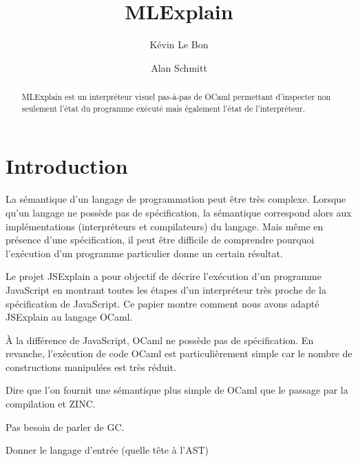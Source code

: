 \documentclass{easychair}
\title{MLExplain}
\author{
  Kévin Le Bon\inst{1}
  \and
  Alan Schmitt\inst{1}
}
\institute{
  Inria
 }
\begin{document}
\maketitle

\begin{abstract}
MLExplain est un interpréteur visuel pas-à-pas de OCaml permettant
d'inspecter non seulement l'état du programme exécuté mais également
l'état de l'interpréteur.
\end{abstract}

\section{Introduction}

La sémantique d'un langage de programmation peut être très complexe. Lorsque
qu'un langage ne possède pas de spécification, la sémantique correspond alors
aux implémentations (interpréteurs et compilateurs) du langage. Mais même en
présence d'une spécification, il peut être difficile de comprendre pourquoi
l'exécution d'un programme particulier donne un certain résultat.

Le projet JSExplain a pour objectif de décrire l'exécution d'un programme
JavaScript en montrant toutes les étapes d'un interpréteur très proche de la
spécification de JavaScript. Ce papier montre comment nous avons adapté
JSExplain au langage OCaml.

À la différence de JavaScript, OCaml ne possède pas de spécification. En
revanche, l'exécution de code OCaml est particulièrement simple car le nombre de
constructions manipulées est très réduit. 

Dire que l'on fournit une sémantique plus simple de OCaml que le passage par la
compilation et ZINC.

Pas besoin de parler de GC.

Donner le langage d'entrée (quelle tête à l'AST)
\end{document}
